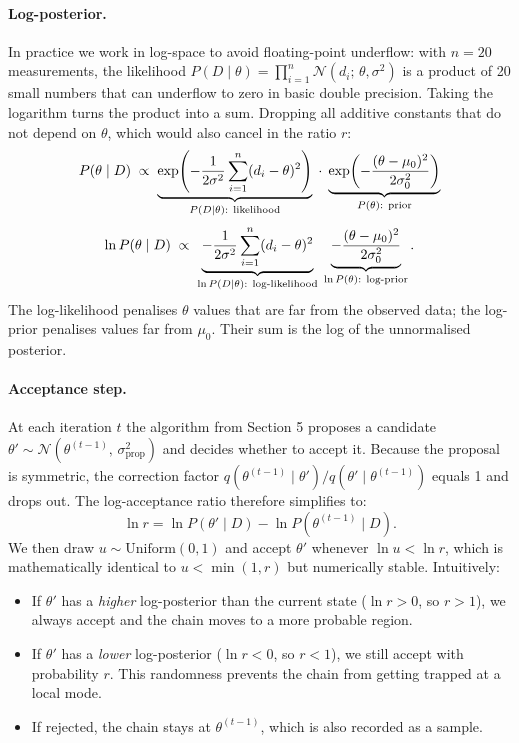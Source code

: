 \documentclass[12pt, a4paper]{article}
\begin{document}
\paragraph{Log-posterior.}
In practice we work in log-space to avoid floating-point underflow:
with $n = 20$ measurements, the likelihood
$P(D \mid \theta) = \prod_{i=1}^{n} \mathcal{N}(d_i;\, \theta, \sigma^2)$
is a product of 20 small numbers that can underflow to zero in basic
double precision. Taking the logarithm turns the product into a sum.
Dropping all additive constants that do not depend on $\theta$, which
would also cancel in the ratio $r$:
\[
    P(\theta \mid D)
    \;\propto\;
    \underbrace{\exp\!\left(-\frac{1}{2\sigma^2}\sum_{i=1}^{n}(d_i - \theta)^2\right)}_%
    {P(D\mid\theta)\text{: likelihood}}
    \;\cdot\;
    \underbrace{\exp\!\left(-\frac{(\theta - \mu_0)^2}{2\sigma_0^2}\right)}_%
    {P(\theta)\text{: prior}}
\]
\[
    \ln P(\theta \mid D)
    \;\propto\;
    \underbrace{-\frac{1}{2\sigma^2}\sum_{i=1}^{n}(d_i - \theta)^2}_%
    {\ln P(D\mid\theta)\text{: log-likelihood}}
    \;
    \underbrace{-\frac{(\theta - \mu_0)^2}{2\sigma_0^2}}_{\ln P(\theta)\text{: log-prior}}.
\]
The log-likelihood penalises $\theta$ values that are far from the
observed data; the log-prior penalises values far from $\mu_0$.
Their sum is the log of the unnormalised posterior.

\paragraph{Acceptance step.}
At each iteration $t$ the algorithm from Section 5 proposes a candidate
$\theta' \sim \mathcal{N}(\theta^{(t-1)},\, \sigma_\text{prop}^2)$
and decides whether to accept it. Because the proposal is symmetric,
the correction factor $q(\theta^{(t-1)} \mid \theta') /
q(\theta' \mid \theta^{(t-1)})$ equals 1 and drops out.
The log-acceptance ratio therefore simplifies to:
\[
    \ln r = \ln P(\theta' \mid D) - \ln P(\theta^{(t-1)} \mid D).
\]
We then draw $u \sim \mathrm{Uniform}(0,1)$ and accept $\theta'$
whenever $\ln u < \ln r$, which is mathematically identical to
$u < \min(1, r)$ but numerically stable. Intuitively:
\begin{itemize}
    \item If $\theta'$ has a \emph{higher} log-posterior than the current
          state ($\ln r > 0$, so $r > 1$), we always accept and the chain
          moves to a more probable region.
    \item If $\theta'$ has a \emph{lower} log-posterior ($\ln r < 0$,
          so $r < 1$), we still accept with probability $r$. This
          randomness prevents the chain from getting trapped at a local
          mode.
    \item If rejected, the chain stays at $\theta^{(t-1)}$, which is
          also recorded as a sample.
\end{itemize}
\end{document}
